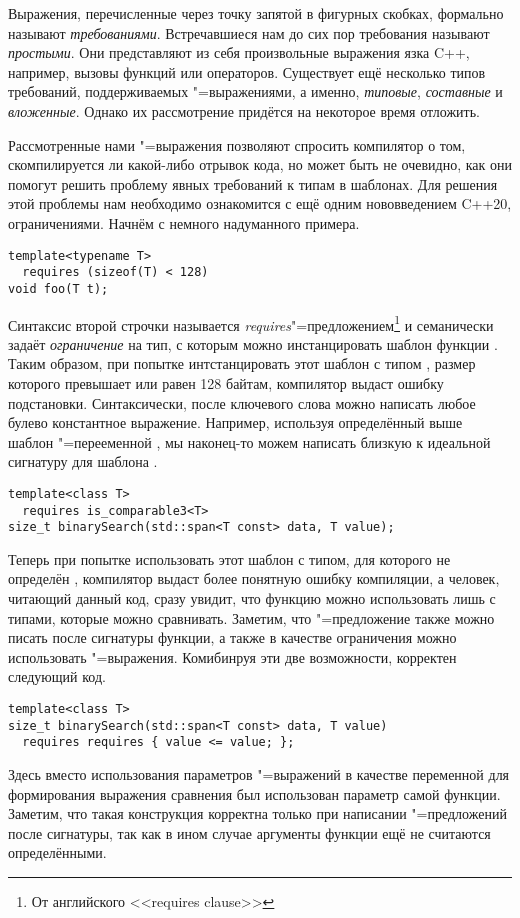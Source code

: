 Выражения, перечисленные через точку запятой в фигурных скобках, формально называют \textit{требованиями}.
Встречавшиеся нам до сих пор требования называют \textit{простыми}. Они представляют из себя произвольные выражения язка C++, например, вызовы функций или операторов.
Существует ещё несколько типов требований, поддерживаемых "=выражениями, а именно, \textit{типовые}, \textit{составные} и \textit{вложенные}.
Однако их рассмотрение придётся на некоторое время отложить.

Рассмотренные нами "=выражения позволяют спросить компилятор о том, скомпилируется ли какой-либо отрывок кода, но может быть не очевидно, как они помогут решить проблему явных требований к типам в шаблонах.
Для решения этой проблемы нам необходимо ознакомится с ещё одним нововведением C++20, ограничениями.
Начнём с немного надуманного примера.
\begin{verbatim}
template<typename T>
  requires (sizeof(T) < 128)
void foo(T t);
\end{verbatim}
Синтаксис второй строчки называется \textit{requires}"=предложением\footnote{От английского <<requires clause>>} и семанически задаёт \textit{ограничение} на тип, с которым можно инстанцировать шаблон функции .
Таким образом, при попытке интстанцировать этот шаблон с типом , размер которого превышает или равен 128 байтам, компилятор выдаст ошибку подстановки.
Синтаксически, после ключевого слова  можно написать любое булево константное выражение.
Например, используя определённый выше шаблон "=перееменной , мы наконец-то можем написать близкую к идеальной сигнатуру для шаблона .
\begin{verbatim}
template<class T>
  requires is_comparable3<T>
size_t binarySearch(std::span<T const> data, T value);
\end{verbatim}
Теперь при попытке использовать этот шаблон с типом, для которого не определён , компилятор выдаст более понятную ошибку компиляции, а человек, читающий данный код, сразу увидит, что функцию можно использовать лишь с типами, которые можно сравнивать.
Заметим, что "=предложение также можно писать после сигнатуры функции, а также в качестве ограничения можно использовать "=выражения.
Комибинруя эти две возможности, корректен следующий код.
\begin{verbatim}
template<class T>
size_t binarySearch(std::span<T const> data, T value)
  requires requires { value <= value; };
\end{verbatim}
Здесь вместо использования параметров "=выражений в качестве переменной для формирования выражения сравнения был использован параметр самой функции.
Заметим, что такая конструкция корректна только при написании "=предложений после сигнатуры, так как в ином случае аргументы функции ещё не считаются определёнными.


